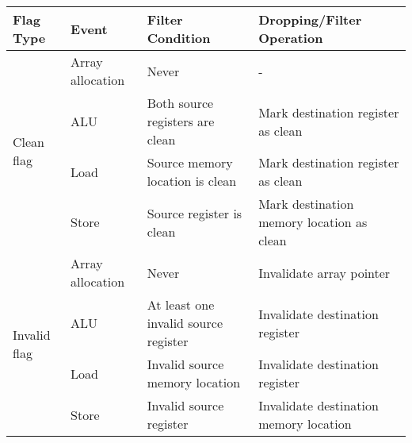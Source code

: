 

\begin{tabular}{|l|l|l|l|}
\hline

{\bf Flag Type} & {\bf Event} & {\bf Filter Condition} & {\bf Dropping/Filter Operation} \\ \hline \hline

\multirow{4}{*}{Clean flag}  
& Array allocation & Never & - \\ \cline{2-4}
& ALU   & Both source registers are clean & Mark destination register as clean \\ \cline{2-4}
& Load  & Source memory location is clean & Mark destination register as clean \\ \cline{2-4}
& Store & Source register is clean & Mark destination memory location as clean \\
\hline\hline

\multirow{4}{*}{Invalid flag}  
& Array allocation & Never & Invalidate array pointer \\ \cline{2-4}
& ALU   & At least one invalid source register & Invalidate destination register \\ \cline{2-4}
& Load  & Invalid source memory location & Invalidate destination register \\ \cline{2-4}
& Store & Invalid source register & Invalidate destination memory location \\
\hline%



% 


\end{tabular}
